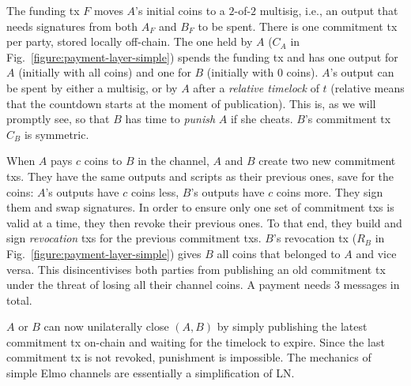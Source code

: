   The funding tx $F$ moves $A$'s initial coins to a $2$-of-$2$ multisig, i.e., an
  output that needs signatures from both $A_F$ and $B_F$ to be spent. There is one
  commitment tx per party, stored locally off-chain. The one held by $A$
  ($C_A$ in Fig.~\ref{figure:payment-layer-simple}) spends the funding tx
  and has one output for $A$ (initially with all coins) and one for $B$
  (initially with $0$ coins). $A$'s output can be spent by either a multisig, or
  by $A$ after a \emph{relative timelock} of $t$ (relative means that the countdown starts at the moment of
  publication). This is, as we will promptly see, so
  that $B$ has time to \emph{punish} $A$ if she cheats. $B$'s commitment tx
  $C_B$ is symmetric.

  When $A$ pays $c$ coins to $B$ in the channel, $A$ and $B$ create two new
  commitment txs.
  They have the same outputs and scripts as their previous ones, save for the
  coins: $A$'s outputs have $c$ coins less, $B$'s outputs have $c$ coins more.
  They sign them and swap signatures. In order to ensure only one set of
  commitment txs is valid at a time, they then revoke their previous ones. To
  that end, they build and sign \emph{revocation} txs for the previous
  commitment txs. $B$'s revocation tx ($R_B$ in
  Fig.~\ref{figure:payment-layer-simple}) gives $B$ all coins that belonged
  to $A$ and vice versa. This disincentivises both parties
  from publishing an old commitment tx under the threat of
  losing all their channel coins. A payment needs $3$ messages in total.

  $A$ or $B$ can now unilaterally close $(A, B)$ by simply publishing the latest
  commitment tx on-chain and waiting for the timelock to expire. Since the last
  commitment tx is not revoked, punishment is impossible. The
  mechanics of simple Elmo channels are essentially a simplification of LN.

